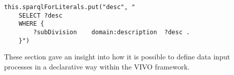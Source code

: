 \begin{lstlisting}[captionpos=b, caption= SPARQL forExisting variable definition, label=skullJSON, belowskip=1em, aboveskip=2em,
basicstyle=\footnotesize,frame=single]
	this.sparqlForLiterals.put("desc", "
	SELECT ?desc
	WHERE { 
		?subDivision	domain:description	?desc .
	}")
\end{lstlisting}

These section gave an insight into how it is possible to define data input processes in a declarative way within the VIVO framework.

